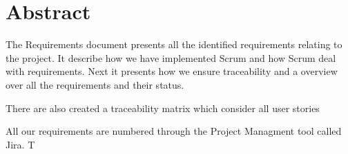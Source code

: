 \section*{Abstract}
The Requirements document presents all the identified requirements relating to the project. It describe how we have implemented Scrum and how Scrum deal with requirements. Next it presents how we ensure traceability and a overview over all the requirements and their status. 

There are also created a traceability matrix which consider all user stories 

All our requirements are numbered through the Project Managment tool called Jira. T